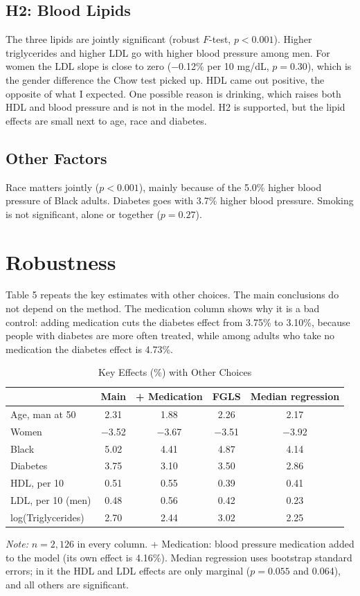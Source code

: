 \documentclass[preprint,letterpaper,11pt,authoryear]{elsarticle}
\newenvironment{tablenotes}{\par\vspace{3pt}\begin{minipage}{0.95\linewidth}\footnotesize\textit{Note:} }{\end{minipage}}
\begin{document}
\subsection{H2: Blood Lipids}
The three lipids are jointly significant (robust $F$-test, $p < 0.001$). Higher triglycerides and higher LDL go with higher blood pressure among men. For women the LDL slope is close to zero ($-$0.12\% per 10 mg/dL, $p = 0.30$), which is the gender difference the Chow test picked up. HDL came out positive, the opposite of what I expected. One possible reason is drinking, which raises both HDL and blood pressure and is not in the model. H2 is supported, but the lipid effects are small next to age, race and diabetes.

\subsection{Other Factors}
Race matters jointly ($p < 0.001$), mainly because of the 5.0\% higher blood pressure of Black adults. Diabetes goes with 3.7\% higher blood pressure. Smoking is not significant, alone or together ($p = 0.27$).

\section{Robustness}
\label{sec:robust}
Table 5 repeats the key estimates with other choices. The main conclusions do not depend on the method. The medication column shows why it is a bad control: adding medication cuts the diabetes effect from 3.75\% to 3.10\%, because people with diabetes are more often treated, while among adults who take no medication the diabetes effect is 4.73\%.

\begin{table}[!htbp]
\centering\small\setlength{\tabcolsep}{6pt}
\caption{Key Effects (\%) with Other Choices}
{\begin{tabular}{lcccc}
\toprule
 & Main & + Medication & FGLS & Median regression \\
\midrule
Age, man at 50 & 2.31 & 1.88 & 2.26 & 2.17 \\
Women & $-$3.52 & $-$3.67 & $-$3.51 & $-$3.92 \\
Black & 5.02 & 4.41 & 4.87 & 4.14 \\
Diabetes & 3.75 & 3.10 & 3.50 & 2.86 \\
HDL, per 10 & 0.51 & 0.55 & 0.39 & 0.41 \\
LDL, per 10 (men) & 0.48 & 0.56 & 0.42 & 0.23 \\
log(Triglycerides) & 2.70 & 2.44 & 3.02 & 2.25 \\
\bottomrule
\end{tabular}}
\begin{tablenotes}
$n = 2{,}126$ in every column. + Medication: blood pressure medication added to the model (its own effect is 4.16\%). Median regression uses bootstrap standard errors; in it the HDL and LDL effects are only marginal ($p = 0.055$ and 0.064), and all others are significant.
\end{tablenotes}
\end{table}
\end{document}
